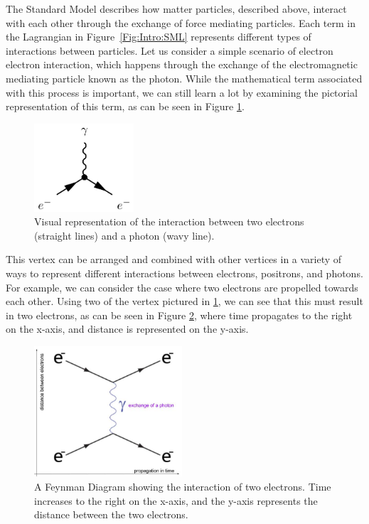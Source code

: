 The Standard Model describes how matter particles, described above, interact with each other through the exchange of force mediating particles. Each term in the Lagrangian in Figure~\ref{Fig:Intro:SML} represents different types of interactions between particles. Let us consider a simple scenario of electron electron interaction, which happens through the exchange of the electromagnetic mediating particle known as the photon. While the mathematical term associated with this process is important, we can still learn a lot by examining the pictorial representation of this term, as can be seen in Figure \ref{Fig:Intro:Vertex1}. 
\begin{figure}[h]
    \centering
        \includegraphics[width=0.33\textwidth]{F1/Vertex1}
        \caption{Visual representation of the interaction between two electrons (straight lines) and a photon (wavy line).}
        \label{Fig:Intro:Vertex1}
\end{figure}
This vertex can be arranged and combined with other vertices in a variety of ways to represent different interactions between electrons, positrons, and photons. For example, we can consider the case where two electrons are propelled towards each other. Using two of the vertex pictured in \ref{Fig:Intro:Vertex1}, we can see that this must result in two electrons, as can be seen in Figure \ref{Fig:Intro:Feynman1}, where time propagates to the right on the x-axis, and distance is represented on the y-axis. 
\begin{figure}[h]
    \centering
        \includegraphics[width=0.49\textwidth]{F1/FeynDiag1}
        \caption{A Feynman Diagram showing the interaction of two electrons. Time increases to the right on the x-axis, and the y-axis represents the distance between the two electrons.}
        \label{Fig:Intro:Feynman1}
\end{figure}
